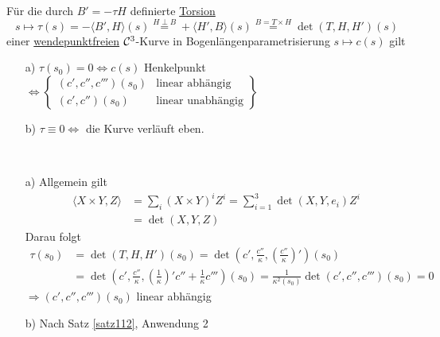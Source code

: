 \begin{satz}\label{satz133}
 Für die durch \(B' = - \tau H\) definierte \uline{Torsion} 
 \[
  s \mapsto \tau(s) = - \langle B', H \rangle (s) \stackrel{H \perp B}{=} + \langle H', B \rangle (s) \stackrel{B = T \times H}{=} \det (T,H,H')(s)
 \]
einer \uline{wendepunktfreien} \(\mathcal{C}^3\)-Kurve in Bogenlängenparametrisierung \(s \mapsto c(s)\) gilt
\begin{enumerate}
 \item[a)] \( \tau(s_0) = 0 \Leftrightarrow c(s)\) Henkelpunkt \(\Leftrightarrow \begin{Bmatrix}
                                                                                  (c', c'', c''')(s_0) &\text{linear abhängig} \\
                                                                                  (c',c'') (s_0) & \text{linear unabhängig}
                                                                                 \end{Bmatrix}\)
 \item[b)] \(\tau \equiv 0 \Leftrightarrow\) die Kurve verläuft eben.
\end{enumerate}
\end{satz}

\begin{beweis} \(\)
 \begin{enumerate}
  \item[a)] Allgemein gilt
  \begin{align*}
  \langle X \times Y, Z \rangle &= \sum_i (X \times Y)^i Z^i = \sum_{i=1}^3 \det (X,Y,e_i) Z^i \\
  &=\det(X,Y,Z)
  \end{align*}
  Darau folgt
  \begin{align*}
   \tau(s_0) &= \det (T,H,H')(s_0) = \det \left( c', \frac{c''}{\kappa}, \left(\frac{c''}{\kappa}\right)'\right)(s_0) \\
   &= \det \left(c', \frac{c''}{\kappa}, \left(\frac1\kappa\right)' c'' + \frac1\kappa c'''\right)(s_0) = \frac{1}{\kappa^2(s_0)} \det \left(c',c'',c'''\right)(s_0)=0
  \end{align*}
\(\Rightarrow (c', c'', c''')(s_0)\) linear abhängig
  \item[b)] Nach Satz \ref{satz112}, Anwendung 2
 \end{enumerate}
\end{beweis}

